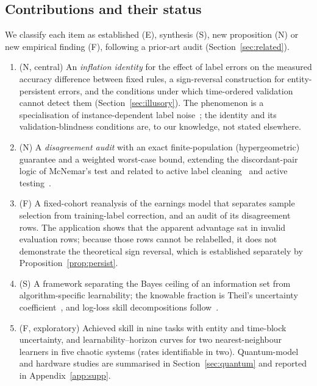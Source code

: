\documentclass[journal]{IEEEtran}
\theoremstyle{definition}
\begin{document}
\subsection{Contributions and their status}
We classify each item as established (E), synthesis (S), new proposition (N) or new empirical finding (F), following a prior-art audit (Section~\ref{sec:related}).
\begin{enumerate}
\item (N, central) An \emph{inflation identity} for the effect of label errors on the measured accuracy difference between fixed rules, a sign-reversal construction for entity-persistent errors, and the conditions under which time-ordered validation cannot detect them (Section~\ref{sec:illusory}). The phenomenon is a specialisation of instance-dependent label noise~\cite{frenay2014survey,xia2020part}; the identity and its validation-blindness conditions are, to our knowledge, not stated elsewhere.
\item (N) A \emph{disagreement audit} with an exact finite-population (hypergeometric) guarantee and a weighted worst-case bound, extending the discordant-pair logic of McNemar's test and related to active label cleaning~\cite{bernhardt2022active} and active testing~\cite{kossen2021active}.
\item (F) A fixed-cohort reanalysis of the earnings model that separates sample selection from training-label correction, and an audit of its disagreement rows. The application shows that the apparent advantage sat in invalid evaluation rows; because those rows cannot be relabelled, it does not demonstrate the theoretical sign reversal, which is established separately by Proposition~\ref{prop:persist}.
\item (S) A framework separating the Bayes ceiling of an information set from algorithm-specific learnability; the knowable fraction is Theil's uncertainty coefficient~\cite{theil1970estimation}, and log-loss skill decompositions follow~\cite{weijs2010kl,roulston2002evaluating}.
\item (F, exploratory) Achieved skill in nine tasks with entity and time-block uncertainty, and learnability--horizon curves for two nearest-neighbour learners in five chaotic systems (rates identifiable in two). Quantum-model and hardware studies are summarised in Section~\ref{sec:quantum} and reported in Appendix~\ref{app:supp}.
\end{enumerate}
\end{document}
